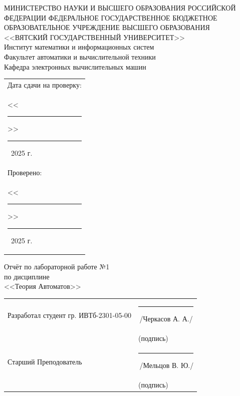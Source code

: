 \documentclass[oneside,a4paper,14pt]{extarticle}
\begin{document}
\newpage
\thispagestyle{empty}
\begin{center}
  МИНИСТЕРСТВО НАУКИ И ВЫСШЕГО ОБРАЗОВАНИЯ РОССИЙСКОЙ ФЕДЕРАЦИИ ФЕДЕРАЛЬНОЕ ГОСУДАРСТВЕННОЕ БЮДЖЕТНОЕ ОБРАЗОВАТЕЛЬНОЕ УЧРЕЖДЕНИЕ ВЫСШЕГО ОБРАЗОВАНИЯ\\
  <<ВЯТСКИЙ ГОСУДАРСТВЕННЫЙ УНИВЕРСИТЕТ>>\\
  Институт математики и информационных систем\\
  Факультет автоматики и вычислительной техники\\
  Кафедра электронных вычислительных машин
\end{center}
\vspace{10mm}

\hfill
\begin{tabular}{l}
  \footnotesize Дата сдачи на проверку:                                          \\
  \footnotesize <<\rule[-1mm]{5mm}{0.10mm}\/>>\rule[-1mm]{20mm}{0.10mm}\ 2025 г. \\
  \footnotesize Проверено:                                                       \\
  \footnotesize <<\rule[-1mm]{5mm}{0.10mm}\/>>\rule[-1mm]{20mm}{0.10mm}\ 2025 г. \\
\end{tabular}
\vfill

\begin{center}
  Отчёт по лабораторной работе №1\\
  по дисциплине\\
  <<Теория Автоматов>>\\
\end{center}
\vspace{25mm}
\noindent
\begin{tabular}{ll}
  Разработал студент гр. ИВТб-2301-05-00 & \hspace{18mm}\rule[-1mm]{30mm}{0.10mm}\,/Черкасов А. А./ \\
                                         & \hspace{25.5mm}\footnotesize(подпись)                    \\
  Старший Преподователь                  & \hspace{18mm}\rule[-1mm]{30mm}{0.10mm}\,/Мельцов В. Ю./  \\
                                         & \hspace{25.5mm}\footnotesize(подпись)                    \\
\end{tabular}
\end{document}
